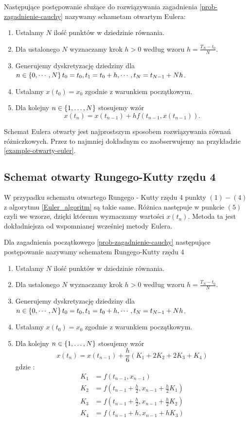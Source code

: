 \documentclass[12pt,a4paper]{report}
\begin{document}
\begin{algorithm}\label{Euler_algoritm}
Następujące postępowanie służące do rozwiązywania zagadnienia \ref{prob-zagadnienie-cauchy} nazywamy schametam otwartym Eulera:
\begin{enumerate}
\item Ustalamy $N$ ilość punktów w dziedzinie równania. 
\item Dla ustalonego $N$ wyznaczamy krok $h>0$ według wzoru $h=\frac{T_N - t_0}{N}$. 
\item Generujemy dyskretyzację dziedziny dla $ n \in \left\lbrace {0,\cdots,N} \right\rbrace  t_0 = t_0, t_1 = t_0 + h, \cdots, t_N = t_{N-1}+ Nh$. 
\item Ustalamy $x(t_0) = x_0$ zgodnie z warunkiem początkowym.
\item Dla kolejny $n \in \left\lbrace {1, \ldots, N} \right\rbrace$ stosujemy wzór
$$
x(t_{n}) = x(t_{n-1}) + h f(t_{n-1}, x(t_{n-1})).
$$
\end{enumerate}
\end{algorithm}
Schemat Eulera otwarty jest najprostszym sposobem rozwiązywania równań różniczkowych. Przez to najmniej dokładnym co zaobserwujemy na przykładzie \ref{example-otwarty-euler}. 
\subsection{Schemat otwarty Rungego-Kutty rzędu 4}
W przypadku schematu otwartego Rungego - Kutty rzędu 4 punkty $ (1) - (4) $ z algorytmu \ref{Euler_algoritm} są takie same. Różnica następuje w punkcie $(5)$ czyli we wzorze, dzięki któremu wyznaczamy wartości $x(t_n)$. Metoda ta jest dokładniejsza od wspomnianej wcześniej metody Eulera.
\begin{algorithm}
Dla zagadnienia początkowego \ref{prob-zagadnienie-cauchy} następujące postępowanie nazywamy schematem Rungego-Kutty rzędu 4 
\begin{enumerate}
\item Ustalamy $N$ ilość punktów w dziedzinie równania. 
\item Dla ustalonego $N$ wyznaczamy krok $h>0$ według wzoru $h=\frac{T_N-t_0}{N}$. 
\item Generujemy dyskretyzację dziedziny dla $n \in \left\lbrace {0,\cdots,N} \right\rbrace  t_0 = t_0, t_1 = t_0 + h, \cdots, t_N = t_{N-1}+ Nh$. 
\item Ustalamy $x(t_0) = x_0$ zgodnie z warunkiem początkowym.
\item Dla kolejny $n \in \left\lbrace {1, \ldots, N} \right\rbrace$ stosujemy wzór
$$
x(t_{n}) = x(t_{n-1}) + \frac{h}{6} ( K_1 + 2K_2 + 2K_3 + K_4 )
$$
gdzie :
$$
\begin{array}{cl}
K_1 &= f(t_{n-1},x_{n-1}) \\
K_2 &= f(t_{n-1} + \frac{h}{2}, x_{n-1} + \frac{h}{2} K_1) \\
K_3 &= f(t_{n-1} + \frac{h}{2}, x_{n-1} + \frac{h}{2} K_2) \\
K_4 &= f(t_{n-1} + h, x_{n-1} + hK_3) 
\end{array}
$$
\end{enumerate}
\end{algorithm}
\end{document}
